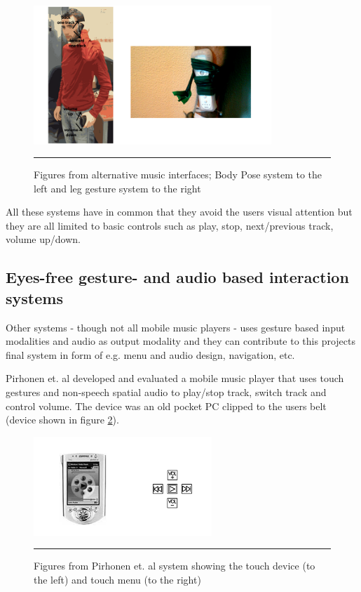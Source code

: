 \begin{figure}[htbp]
	\centering
		\includegraphics[width=0.8\textwidth,height=\textheight,keepaspectratio]{./Figures/bodyposeandleg.png}
		\rule{35em}{0.5pt}
	\caption[Alternative music players]{Figures from alternative music interfaces; Body Pose system \cite{strachan_bodyspace_2007} to the left and leg gesture system \cite{smus_running_2010} to the right}
	\label{fig:bodyandleg}
\end{figure}

All these systems have in common that they avoid the users visual attention but they are all limited to basic controls such as play, stop, next/previous track, volume up/down.

\subsection{Eyes-free gesture- and audio based interaction systems}
Other systems - though not all mobile music players - uses gesture based input modalities and audio as output modality and they can contribute to this projects final system in form of e.g. menu and audio design, navigation, etc.

Pirhonen et. al \cite{pirhonen_gestural_2002} developed and evaluated a mobile music player that uses touch gestures and non-speech spatial audio to play/stop track, switch track and control volume. The device was an old pocket PC clipped to the users belt (device shown in figure \ref{fig:pirhonen}).

\begin{figure}[htbp]
	\centering
		\includegraphics[width=0.6\textwidth,height=\textheight,keepaspectratio]{./Figures/pirhonen-system.png}
		\rule{35em}{0.5pt}
	\caption[Pirhonen system]{Figures from Pirhonen et. al \cite{pirhonen_gestural_2002} system showing the touch device (to the left) and touch menu (to the right)}
	\label{fig:pirhonen}
\end{figure}

